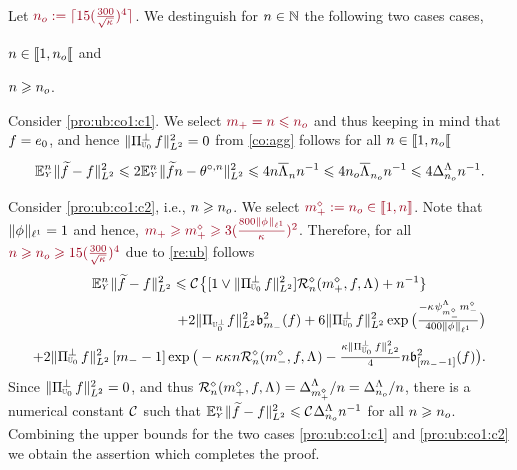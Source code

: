 \begin{pro}
Let $\dr\ssY_o:=\ceil{15(\tfrac{300}{\sqrt{\cpen}})^4}$. We destinguish for $\ssY\in\Nz$ the following two cases
cases, \begin{inparaenum}[i]\renewcommand{\theenumi}{\dgrau\rm(\alph{enumi})}\item\label{pro:ub:co1:c1}
$\ssY\in\nsetro{1,\ssY_o}$ and \item\label{pro:ub:co1:c2}
$\ssY\geq\ssY_o$.\end{inparaenum}

Consider \ref{pro:ub:co1:c1}. We select 
$\dr\pDi=\ssY\leq\ssY_o$ and thus keeping in mind that $\xdf=\bas_0$,
and hence $\VnormLp{\Proj[{\mHiH[0]}]^\perp\xdf}^2=0$  from
\cref{co:agg} follows for all $\ssY\in\nsetro{1,\ssY_o}$
\begin{equation}\label{pro:ub:co1:e1}
\FuEx[\ssY]{\rY}\VnormLp{\txdf-\xdf}^2\leq2\FuEx[\ssY]{\rY}\VnormLp{\txdfPr[\ssY]-\xdfPr[\ssY]}^2\leq4\ssY\oiSv[\ssY]\ssY^{-1}\leq
4 \ssY_o\oiSv[\ssY_o]\ssY^{-1}\leq4\DipenSv[\ssY_o]\ssY^{-1}.
\end{equation}

Consider \ref{pro:ub:co1:c2}, i.e., $\ssY\geq\ssY_o$. We select
$\dr\pdDi:=\ssY_o\in\nset{1,\ssY}$. 
Note that $\Vnormlp[1]{\fydf}=1$ and hence, $\dr\pDi\geq\pdDi\geq
3(\tfrac{800\Vnormlp[1]{\fydf}}{\cpen})^2$. Therefore, for all  $\dr
\ssY\geq \ssY_o\geq 15(\tfrac{300}{\sqrt{\cpen}})^4$ due to \cref{re:ub} 
 follows
\begin{multline*}
\FuEx[\ssY]{\rY}\VnormLp{\txdf-\xdf}^2\leq\cst{}\big\{
[1\vee\VnormLp{\Proj[{\mHiH[0]}]^\perp\xdf}^2]\hRa{\pdDi,\xdf,\iSv}+\ssY^{-1}\}\\\hfill
+2\VnormLp{\Proj[{\mHiH[0]^\perp}]\xdf}^2\bias[\mDi]^2(\xdf)
+6\VnormLp{\Proj[{\mHiH[0]}]^\perp\xdf}^2 \exp\big(\tfrac{-\cpen\cmSv[\mdDi]\mdDi}{400\Vnormlp[1]{\fydf}}\big)
\\\hfill
\hfill+2\VnormLp{\Proj[{\mHiH[0]}]^\perp\xdf}^2\,[\mDi-1]\exp\big(-\rWc\cpen\ssY\hRa{\mdDi,\xdf,\iSv}-
    \tfrac{\rWc\VnormLp{\Proj[{\mHiH[0]}]^\perp\xdf}^2}{4}\ssY\bias[{[\mDi-1]}]^2(\xdf)\big).
\end{multline*}
Since
$\VnormLp{\Proj[{\mHiH[0]}]^\perp\xdf}^2=0$, and thus
$\hRa{\pdDi,\xdf,\iSv}=\DipenSv[\pdDi]/\ssY=\DipenSv[\ssY_o]/\ssY$,
there is a numerical constant $\cst{}$ such that
$\FuEx[\ssY]{\rY}\VnormLp{\txdf-\xdf}^2\leq\cst{}\DipenSv[\ssY_o]\ssY^{-1}$
for all $\ssY\geq\ssY_o$. Combining
the upper bounds  for the two
cases \ref{pro:ub:co1:c1} and \ref{pro:ub:co1:c2}  we obtain the
assertion which  completes the proof.\proEnd\end{pro}


